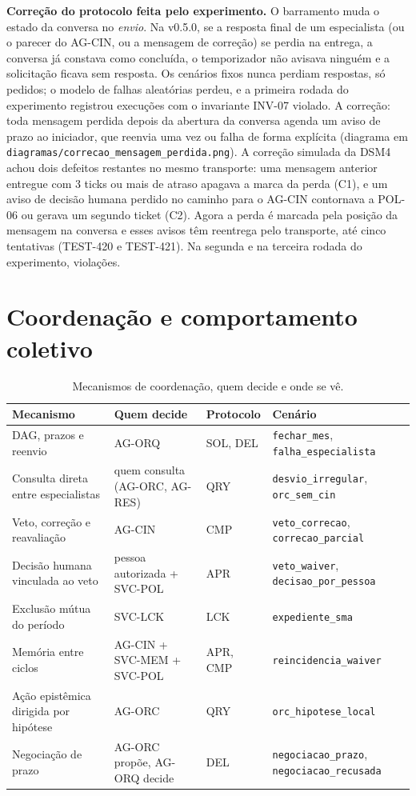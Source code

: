 \documentclass[10pt,a4paper]{article}
\newcommand{\code}[1]{\texttt{#1}}
\newenvironment{tabela}[1]{\begin{table}[H]\centering\footnotesize\renewcommand{\arraystretch}{1.1}\caption{#1}}{\end{table}}
\begin{document}
\textbf{Correção do protocolo feita pelo experimento.} O barramento muda o estado da conversa no \emph{envio}. Na
v0.5.0, se a resposta final de um especialista (ou o parecer do AG-CIN, ou a mensagem de correção) se perdia na
entrega, a conversa já constava como concluída, o temporizador não avisava ninguém e a solicitação ficava sem resposta.
Os cenários fixos nunca perdiam respostas, só pedidos; o modelo de falhas aleatórias perdeu, e a primeira rodada do
experimento registrou  execuções com o invariante INV-07 violado. A correção: toda mensagem perdida
depois da abertura da conversa agenda um aviso de prazo ao iniciador, que reenvia uma vez ou falha de forma explícita
(diagrama em \code{diagramas/correcao\_mensagem\_perdida.png}). A correção simulada da DSM4 achou dois defeitos
restantes no mesmo transporte: uma mensagem anterior entregue com 3 ticks ou mais de atraso apagava a marca da perda
(C1), e um aviso de decisão humana perdido no caminho para o AG-CIN contornava a POL-06 ou gerava um segundo ticket
(C2). Agora a perda é marcada pela posição da mensagem na conversa e esses avisos têm reentrega pelo transporte, até
cinco tentativas (TEST-420 e TEST-421). Na segunda e na terceira rodada do experimento,  violações.

\section{Coordenação e comportamento coletivo}
\begin{tabela}{Mecanismos de coordenação, quem decide e onde se vê.\label{tab:coord}}
\begin{tabularx}{\linewidth}{L{4.0cm} L{3.4cm} L{2.2cm} Y}
\toprule
\textbf{Mecanismo} & \textbf{Quem decide} & \textbf{Protocolo} & \textbf{Cenário}\\ \midrule
DAG, prazos e reenvio & AG-ORQ & SOL, DEL & \code{fechar\_mes}, \code{falha\_especialista} \\
Consulta direta entre especialistas & quem consulta (AG-ORC, AG-RES) & QRY & \code{desvio\_irregular}, \code{orc\_sem\_cin} \\
Veto, correção e reavaliação & AG-CIN & CMP & \code{veto\_correcao}, \code{correcao\_parcial} \\
Decisão humana vinculada ao veto & pessoa autorizada + SVC-POL & APR & \code{veto\_waiver}, \code{decisao\_por\_pessoa} \\
Exclusão mútua do período & SVC-LCK & LCK & \code{expediente\_sma} \\
Memória entre ciclos & AG-CIN + SVC-MEM + SVC-POL & APR, CMP & \code{reincidencia\_waiver} \\
Ação epistêmica dirigida por hipótese & AG-ORC & QRY & \code{orc\_hipotese\_local} \\
Negociação de prazo & AG-ORC propõe, AG-ORQ decide & DEL & \code{negociacao\_prazo}, \code{negociacao\_recusada} \\
\bottomrule
\end{tabularx}
\end{tabela}
\end{document}
